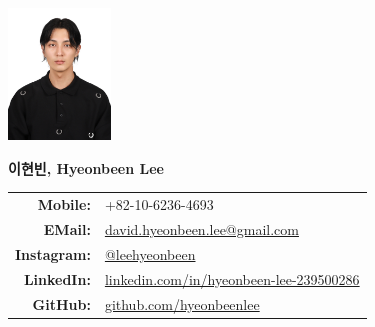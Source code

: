 \documentclass[a4paper,10pt]{extarticle}
\begin{document}
\pagestyle{empty}



\begin{minipage}{0.1\textwidth}
    \begin{flushleft}
        \includegraphics[height=3.5cm]{photo_231008.jpeg}
    \end{flushleft}
\end{minipage}
\hfill
\begin{minipage}{0.7\textwidth}
    \begin{flushright}
        \textbf{\Large 이현빈, Hyeonbeen Lee} %
        \newline\newline
        \begin{tabular}{rl}
            \textbf{Mobile: }    & +82-10-6236-4693                                                                                     \\
            \textbf{EMail: }     & \href{mailto:david.hyeonbeen.lee@gmail.com}{david.hyeonbeen.lee@gmail.com}                           \\
            \textbf{Instagram: } & \href{https://www.instagram.com/leehyeonbeen}{@leehyeonbeen}                                         \\
            \textbf{LinkedIn: }  & \href{https://www.linkedin.com/in/hyeonbeen-lee-239500286/}{linkedin.com/in/hyeonbeen-lee-239500286} \\
            \textbf{GitHub: }    & \href{https://github.com/hyeonbeenlee}{github.com/hyeonbeenlee}                                      \\
        \end{tabular}
    \end{flushright}

\end{minipage}
\end{document}
